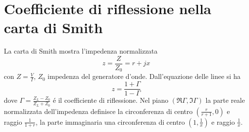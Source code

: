 \documentclass[main.tex]{subfiles}
\begin{document}
\section{Coefficiente di riflessione nella carta di Smith}
La carta di Smith mostra l'impedenza normalizzata
\begin{equation}
z=\frac{Z}{Z_0}=r+jx
\end{equation}
con $Z=\frac{V}{I}$, $Z_0$ impedenza del generatore d'onde. Dall'equazione delle linee si ha
\begin{equation}
z=\frac{1+\Gamma}{1-\Gamma}
\end{equation}
dove $\Gamma=\frac{Z_L-Z_0}{Z_L+Z_0}$ \'e il coefficiente di riflessione.
Nel piano $(\Re{\Gamma},\Im{\Gamma})$ la parte reale normalizzata dell'impedenza definisce la circonferenza di centro $(\frac{r}{r+1},0)$ e raggio $\frac{1}{1+r}$, la parte immaginaria una circonferenza di centro $(1,\frac{1}{x})$ e raggio $\frac{1}{x}$.

\end{document}
